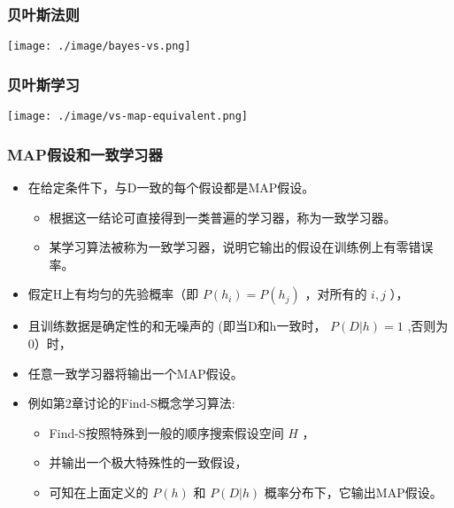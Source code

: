 \documentclass{beamer}
\begin{document}
\begin{frame}
\frametitle{贝叶斯法则}
\label{sec-2-4}

\texttt{[image: ./image/bayes-vs.png]}
\end{frame}
\begin{frame}
\frametitle{贝叶斯学习}
\label{sec-2-5}


\texttt{[image: ./image/vs-map-equivalent.png]}
\end{frame}
\begin{frame}
\frametitle{MAP假设和一致学习器}
\label{sec-2-6}

\begin{itemize}
\item 在给定条件下，与D一致的每个假设都是MAP假设。
\begin{itemize}
\item 根据这一结论可直接得到一类普遍的学习器，称为一致学习器。
\item 某学习算法被称为一致学习器，说明它输出的假设在训练例上有零错误率。
\end{itemize}
\item 假定H上有均匀的先验概率（即 $P(h_i)=P(h_j)$ ，对所有的 $i,j$ ），
\item 且训练数据是确定性的和无噪声的 (即当D和h一致时， $P(D|h)=1$ ,否则为0）时，
\item 任意一致学习器将输出一个MAP假设。
\item 例如第2章讨论的Find-S概念学习算法:
\begin{itemize}
\item Find-S按照特殊到一般的顺序搜索假设空间 $H$ ，
\item 并输出一个极大特殊性的一致假设，
\item 可知在上面定义的 $P(h)$ 和 $P(D|h)$ 概率分布下，它输出MAP假设。
\end{itemize}
\end{itemize}
\end{frame}
\end{document}

